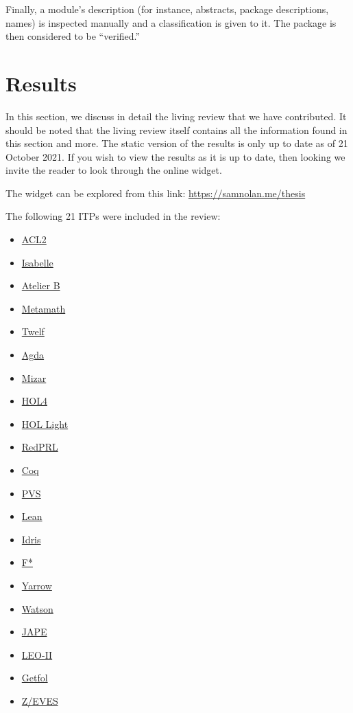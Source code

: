 \documentclass[
]{article}
\providecommand{\tightlist}{%
  \setlength{\itemsep}{0pt}\setlength{\parskip}{0pt}}
\begin{document}
Finally, a module's description (for instance, abstracts, package
descriptions, names) is inspected manually and a classification is given
to it. The package is then considered to be ``verified.''

\hypertarget{results}{%
\section{Results}\label{results}}

In this section, we discuss in detail the living review that we have
contributed. It should be noted that the living review itself contains
all the information found in this section and more. The static version
of the results is only up to date as of 21 October 2021. If you wish to
view the results as it is up to date, then looking we invite the reader
to look through the online widget.

The widget can be explored from this link:
\url{https://samnolan.me/thesis}

The following 21 ITPs were included in the review:

\begin{itemize}
\tightlist
\item
  \href{https://www.cs.utexas.edu/users/moore/acl2/}{ACL2}
\item
  \href{https://isabelle.in.tum.de/}{Isabelle}
\item
  \href{https://www.atelierb.eu/en/atelier-b-tools/}{Atelier B}
\item
  \href{http://us.metamath.org/}{Metamath}
\item
  \href{http://twelf.org/wiki/Main_Page}{Twelf}
\item
  \href{https://wiki.portal.chalmers.se/agda/Main/HomePage}{Agda}
\item
  \href{http://www.mizar.org/}{Mizar}
\item
  \href{https://hol-theorem-prover.org/}{HOL4}
\item
  \href{https://www.cl.cam.ac.uk/~jrh13/hol-light/}{HOL Light}
\item
  \href{https://redprl.org/}{RedPRL}
\item
  \href{https://coq.inria.fr/}{Coq}
\item
  \href{http://pvs.csl.sri.com/}{PVS}
\item
  \href{https://leanprover.github.io/}{Lean}
\item
  \href{https://www.idris-lang.org/}{Idris}
\item
  \href{https://www.fstar-lang.org/}{F*}
\item
  \href{http://www.cs.ru.nl/~janz/yarrow/}{Yarrow}
\item
  \href{https://randall-holmes.github.io/Watson/proverpage.html}{Watson}
\item
  \href{http://japeforall.org.uk/}{JAPE}
\item
  \href{http://page.mi.fu-berlin.de/cbenzmueller/leo/}{LEO-II}
\item
  \href{https://github.com/getfol/GETFOL}{Getfol}
\item
  \href{http://czt.sourceforge.net/eclipse/zeves/}{Z/EVES}
\end{itemize}
\end{document}
